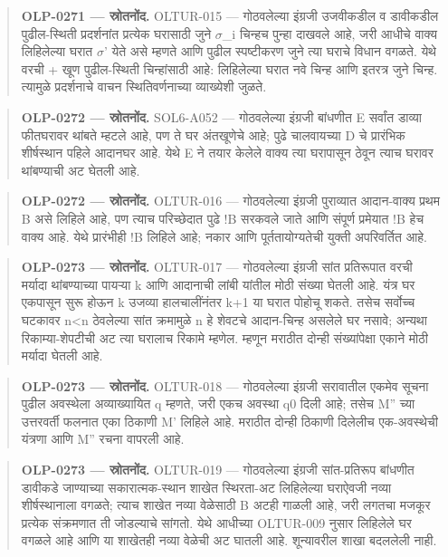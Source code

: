\begin{quote}\small\textbf{OLP-0271 — स्रोतनोंद.} OLTUR-015 — गोठवलेल्या इंग्रजी उजवीकडील व डावीकडील पुढील-स्थिती प्रदर्शनांत प्रत्येक घरासाठी जुने \ensuremath{\sigma}\_i चिन्हच पुन्हा दाखवले आहे, जरी आधीचे वाक्य लिहिलेल्या घरात \ensuremath{\sigma}' येते असे म्हणते आणि पुढील स्पष्टीकरण जुने त्या घराचे विधान वगळते. येथे वरची + खूण पुढील-स्थिती चिन्हांसाठी आहे: लिहिलेल्या घरात नवे चिन्ह आणि इतरत्र जुने चिन्ह. त्यामुळे प्रदर्शनाचे वाचन स्थितिवर्णनाच्या व्याख्येशी जुळते.\end{quote}
\begin{quote}\small\textbf{OLP-0272 — स्रोतनोंद.} SOL6-A052 — गोठवलेल्या इंग्रजी बांधणीत E सर्वांत डाव्या फीतघरावर थांबते म्हटले आहे, पण ते घर अंतखूणेचे आहे; पुढे चालवायच्या D चे प्रारंभिक शीर्षस्थान पहिले आदानघर आहे. येथे E ने तयार केलेले वाक्य त्या घरापासून ठेवून त्याच घरावर थांबण्याची अट घेतली आहे.\end{quote}
\begin{quote}\small\textbf{OLP-0272 — स्रोतनोंद.} OLTUR-016 — गोठवलेल्या इंग्रजी पुराव्यात आदान-वाक्य प्रथम B असे लिहिले आहे, पण त्याच परिच्छेदात पुढे {!}B सरकवले जाते आणि संपूर्ण प्रमेयात {!}B हेच वाक्य आहे. येथे प्रारंभीही {!}B लिहिले आहे; नकार आणि पूर्ततायोग्यतेची युक्ती अपरिवर्तित आहे.\end{quote}
\begin{quote}\small\textbf{OLP-0273 — स्रोतनोंद.} OLTUR-017 — गोठवलेल्या इंग्रजी सांत प्रतिरूपात वरची मर्यादा थांबण्याच्या पायऱ्या k आणि आदानाची लांबी यांतील मोठी संख्या घेतली आहे. यंत्र घर एकपासून सुरू होऊन k उजव्या हालचालींनंतर k+1 या घरात पोहोचू शकते. तसेच सर्वोच्च घटकावर n<n ठेवलेल्या सांत क्रमामुळे n हे शेवटचे आदान-चिन्ह असलेले घर नसावे; अन्यथा रिकाम्या-शेपटीची अट त्या घरालाच रिकामे म्हणेल. म्हणून मराठीत दोन्ही संख्यांपेक्षा एकाने मोठी मर्यादा घेतली आहे.\end{quote}
\begin{quote}\small\textbf{OLP-0273 — स्रोतनोंद.} OLTUR-018 — गोठवलेल्या इंग्रजी सरावातील एकमेव सूचना पुढील अवस्थेला अव्याख्यायित q म्हणते, जरी एकच अवस्था q0 दिली आहे; तसेच M'' च्या उत्तरवर्ती फलनात एका ठिकाणी M' लिहिले आहे. मराठीत दोन्ही ठिकाणी दिलेलीच एक-अवस्थेची यंत्रणा आणि M'' रचना वापरली आहे.\end{quote}
\begin{quote}\small\textbf{OLP-0273 — स्रोतनोंद.} OLTUR-019 — गोठवलेल्या इंग्रजी सांत-प्रतिरूप बांधणीत डावीकडे जाण्याच्या सकारात्मक-स्थान शाखेत स्थिरता-अट लिहिलेल्या घराऐवजी नव्या शीर्षस्थानाला वगळते; त्याच शाखेत नव्या वेळेसाठी B अटही गाळली आहे, जरी लगतचा मजकूर प्रत्येक संक्रमणात ती जोडल्याचे सांगतो. येथे आधीच्या OLTUR-009 नुसार लिहिलेले घर वगळले आहे आणि या शाखेतही नव्या वेळेची अट घातली आहे. शून्यावरील शाखा बदललेली नाही.\end{quote}
